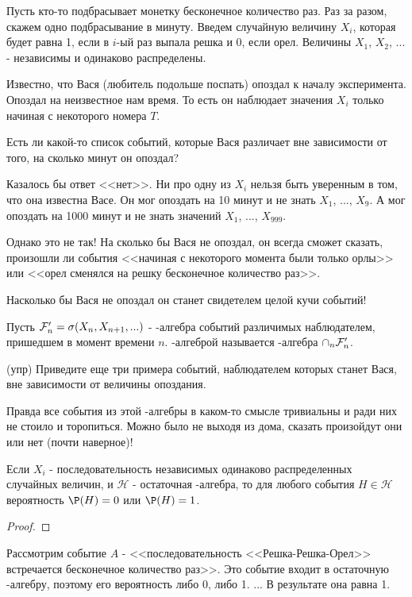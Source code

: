 {Пусть кто-то подбрасывает монетку бесконечное количество раз. Раз за разом, скажем одно подбрасывание в минуту. Введем случайную величину $X_{i}$, которая будет равна 1, если в $i$-ый раз выпала решка и 0, если орел. Величины $X_{1}$, $X_{2}$, ... - независимы и одинаково распределены.

Известно, что Вася (любитель подольше поспать) опоздал к началу эксперимента. Опоздал на неизвестное нам время. То есть он наблюдает значения $X_{i}$ только начиная с некоторого номера $T$.

Есть ли какой-то список событий, которые Вася различает вне зависимости от того, на сколько минут он опоздал?

Казалось бы ответ <<нет>>. Ни про одну из $X_{i}$ нельзя быть уверенным в том, что она известна Васе. Он мог опоздать на 10 минут и не знать $X_{1}$, ..., $X_{9}$. А мог опоздать на 1000 минут и не знать значений $X_{1}$, ..., $X_{999}$.

Однако это не так! На сколько бы Вася не опоздал, он всегда сможет сказать, произошли ли события <<начиная с некоторого момента были только орлы>> или <<орел сменялся на решку бесконечное количество раз>>.

Насколько бы Вася не опоздал он станет свидетелем целой кучи событий!

\begin{mydef} Пусть $\mathcal{F}_{n}'=\sigma(X_{n},X_{n+1},...)$ - \s-алгебра событий различимых наблюдателем, пришедшем в момент времени $n$.  \s-алгеброй называется \s-алгебра $\cap_{n} \mathcal{F}_{n}'$.
\end{mydef}
(упр) Приведите еще три примера событий, наблюдателем которых станет Вася, вне зависимости от величины опоздания.

Правда все события из этой \s-алгебры в каком-то смысле тривиальны и ради них не стоило и торопиться. Можно было не выходя из дома, сказать произойдут они или нет (почти наверное)!

\begin{myth} Если $X_{i}$ - последовательность независимых одинаково распределенных случайных величин, и $\mathcal{H}$ - остаточная \s-алгебра, то для любого события $H\in\mathcal{H}$ вероятность $\P(H)=0$ или $\P(H)=1$.
\end{myth}

\begin{proof}
\end{proof}

\begin{myex} Рассмотрим событие $A$ - <<последовательность <<Решка-Решка-Орел>> встречается бесконечное количество раз>>. Это событие входит в остаточную \s-алгебру, поэтому его вероятность либо 0, либо 1. ... В результате она равна 1.
\end{myex}


}
